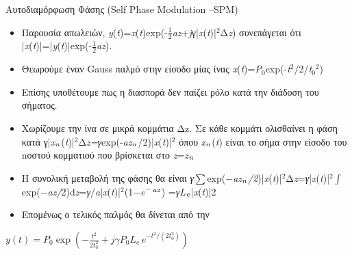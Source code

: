 \documentclass[11pt,aspectratio=169]{beamer}
\begin{document}
\begin{frame}[shrink=20,t]{Αυτοδιαμόρφωση Φάσης (Self Phase Modulation –SPM)}
\begin{itemize}
\item Παρουσία απωλειών, \textit{y}(\textit{t})=\textit{x}(\textit{t})exp(-\ensuremath{\tfrac{1}{2}}\textit{az}+\textit{j}γ|\textit{x}(\textit{t})|$^{\text{2}}$Δ\textit{z}) συνεπάγεται ότι |\textit{x}(\textit{t})|=|\textit{y}(\textit{t})|exp(-\ensuremath{\tfrac{1}{2}}\textit{az}).
\item Θεωρούμε έναν Gauss παλμό στην είσοδο μίας ίνας \textit{x}(\textit{t})=\textit{P}$_{\text{0}}$exp(-\textit{t}$^{\text{2}}$/2/\textit{t}$_{\text{0}}$$^{\text{2}}$)
\item Επίσης υποθέτουμε πως η διασπορά δεν παίζει ρόλο κατά την διάδοση του σήματος.
\item Χωρίζουμε την ίνα σε μικρά κομμάτια Δz. Σε κάθε κομμάτι ολισθαίνει η φάση κατά  γ|\textit{x}$_{\text{\textit{n}}}$(\textit{t})|$^{\text{2}}$Δ\textit{z=}\textit{γ}exp(-\textit{az}$_{\text{\textit{n}}}$/2)|\textit{x}(\textit{t})|$^{\text{2}}$ όπου \textit{x}$_{\text{\textit{n}}}$(\textit{t}) είναι το σήμα στην είσοδο του nοστού κομματιού που βρίσκεται στο \textit{z}=\textit{z}$_{\text{\textit{n}}}$
\item Η συνολική μεταβολή της φάσης θα είναι \textit{γ}\ensuremath{\sum}exp(\ensuremath{-}\textit{az}$_{\text{\textit{n}}}$\textit{/2})|\textit{x}(\textit{t})|$^{\text{2}}$Δ\textit{z}=\textit{γ}|\textit{x}(\textit{t})|$^{\text{2}}$\ensuremath{\int}exp(\ensuremath{-}\textit{az}\textit{/}2)d\textit{z}=\textit{γ}/\textit{a}|\textit{x}(\textit{t})|$^{\text{2}}$(1\ensuremath{-}\textit{e}$^{\text{\ensuremath{-}}}$$^{\text{\textit{az}}}$) =\textit{γ}\textit{L}$_{\text{\textit{e}}}$|\textit{x}(\textit{t})|2
\item Επομένως ο τελικός παλμός θα δίνεται από την
\end{itemize}
\begin{center}
$\displaystyle y(t)=P_{0}\exp\left(-\frac{t^{2}}{2t_{0}^{2}}+j\gamma P_{0}L_{e}\,e^{-t^{2}/(2t_{0}^{2})}\right)$\\[0.6ex]
\end{center}
\end{frame}
\end{document}
